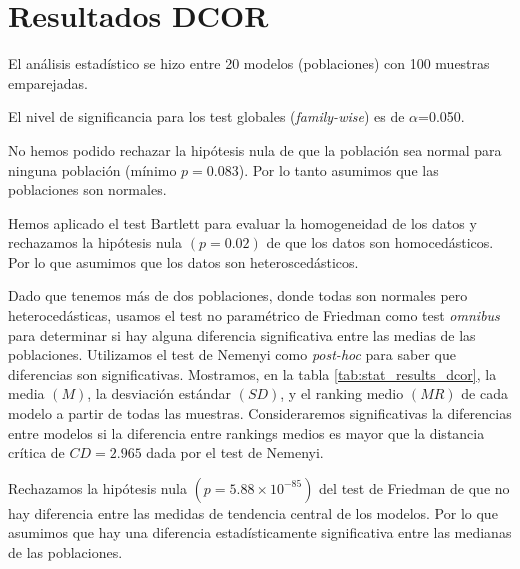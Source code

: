 \documentclass[a4paper,oneside,11pt,leqno]{article}
\begin{document}
	\section{Resultados DCOR}
	\label{sec:results_dcor}
	
	El análisis estadístico se hizo entre 20 modelos (poblaciones) con 100 muestras emparejadas.
	
	El nivel de significancia para los test globales (\textit{family-wise}) es de $\alpha$=0.050.
	
	No hemos podido rechazar la hipótesis nula de que la población sea normal para ninguna población (mínimo $p=0.083$). Por lo tanto asumimos que las poblaciones son normales.
	
	Hemos aplicado el test Bartlett para evaluar la homogeneidad de los datos y rechazamos la hipótesis nula $(p=0.02)$ de que los datos son homocedásticos. Por lo que asumimos que los datos son heteroscedásticos.
	
	
	Dado que tenemos más de dos poblaciones, donde todas son normales pero heterocedásticas, usamos el test no paramétrico de Friedman como test \textit{omnibus} para determinar si hay alguna diferencia significativa entre las medias de las poblaciones. Utilizamos el test de Nemenyi como \textit{post-hoc} para saber que diferencias son significativas. Mostramos, en la tabla \ref{tab:stat_results_dcor}, la media $(M)$, la desviación estándar $(SD)$, y el ranking medio $(MR)$ de cada modelo a partir de todas las muestras. Consideraremos significativas la diferencias entre modelos si la diferencia entre rankings medios es mayor que la distancia crítica de $CD=2.965$ dada por el test de Nemenyi.

	Rechazamos la hipótesis nula $(p=5.88\times 10^{-85})$ del test de Friedman de que no hay diferencia entre las medidas de tendencia central de los modelos. Por lo que asumimos que hay una diferencia estadísticamente significativa entre las medianas de las poblaciones.
	
\end{document}
